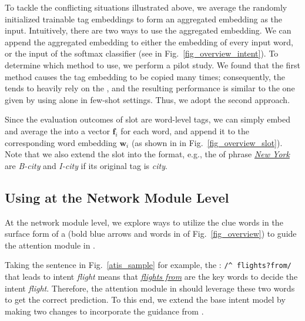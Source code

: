 To tackle the conflicting situations illustrated above, we average the randomly initialized trainable tag embeddings to form an aggregated embedding as the \NN input.
Intuitively, there are two ways to use the aggregated embedding. We can  append the aggregated embedding to either the embedding of every
input word, or the input of the softmax classifier (see  in Fig.~\ref{fig_overview_intent}). To determine which method to use,
we perform a pilot study. We found that the first method causes the tag embedding to be copied many times; consequently, the \NN tends to
heavily rely on the \REtags, and the resulting performance is similar to the one given by using \REs alone in few-shot settings. Thus, we
adopt the second approach.

 Since the evaluation outcomes of slot \REs are word-level tags,
we can simply embed and average the \REtags into a vector $\textbf{f}_i$ for each word, and append it
to the corresponding word embedding $\textbf{w}_i$ (as shown in  in Fig.~\ref{fig_overview_slot}).
Note that we also extend the slot \REtags into the \BIO format, e.g., the \REtags of phrase \textsl{\underline{New York}} are \emph{B-city} and \emph{I-city} if its original tag is \emph{city}.

\subsection{Using \REs at the Network Module Level}
\label{interact_with_module} At the network module level, we explore ways to utilize the clue words in the surface form of a \RE (bold blue arrows and
words in  of Fig.~\ref{fig_overview}) to guide the attention module in \NNs.


 Taking the sentence in Fig.~\ref{atis_sample} for example, the \RE: {\small\texttt{/\textasciicircum
flights?\:from/} } that leads to intent \emph{flight} means that \textsl{\underline{flights from}} are the key words to decide the intent
\emph{flight}. Therefore, the attention module in \NNs should leverage these two words to get the correct prediction. To this end, we
extend the base intent model by making two changes to incorporate the guidance from \REs.

